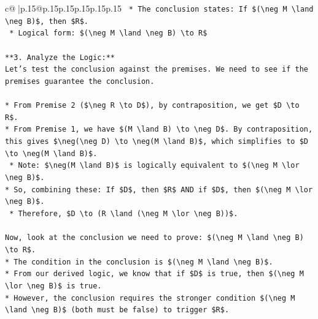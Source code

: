 \documentclass{article}
\begin{document}
{\begin{supertabular}{c@{$\;$}|p{.15\linewidth}@{}p{.15\linewidth}p{.15\linewidth}p{.15\linewidth}p{.15\linewidth}p{.15\linewidth}}
{{{\texttt{    *   The conclusion states: If \$(\textbackslash{}neg M \textbackslash{}land \textbackslash{}neg B)\$, then \$R\$.} \\
\texttt{    *   Logical form: \$(\textbackslash{}neg M \textbackslash{}land \textbackslash{}neg B) \textbackslash{}to R\$} \\
\\ 
\texttt{**3. Analyze the Logic:**} \\
\texttt{Let's test the conclusion against the premises. We need to see if the premises guarantee the conclusion.} \\
\\ 
\texttt{*   From Premise 2 (\$\textbackslash{}neg R \textbackslash{}to D\$), by contraposition, we get \$D \textbackslash{}to R\$.} \\
\texttt{*   From Premise 1, we have \$(M \textbackslash{}land B) \textbackslash{}to \textbackslash{}neg D\$. By contraposition, this gives \$\textbackslash{}neg(\textbackslash{}neg D) \textbackslash{}to \textbackslash{}neg(M \textbackslash{}land B)\$, which simplifies to \$D \textbackslash{}to \textbackslash{}neg(M \textbackslash{}land B)\$.} \\
\texttt{    *   Note: \$\textbackslash{}neg(M \textbackslash{}land B)\$ is logically equivalent to \$(\textbackslash{}neg M \textbackslash{}lor \textbackslash{}neg B)\$.} \\
\texttt{*   So, combining these: If \$D\$, then \$R\$ AND if \$D\$, then \$(\textbackslash{}neg M \textbackslash{}lor \textbackslash{}neg B)\$.} \\
\texttt{    *   Therefore, \$D \textbackslash{}to (R \textbackslash{}land (\textbackslash{}neg M \textbackslash{}lor \textbackslash{}neg B))\$.} \\
\\ 
\texttt{Now, look at the conclusion we need to prove: \$(\textbackslash{}neg M \textbackslash{}land \textbackslash{}neg B) \textbackslash{}to R\$.} \\
\texttt{*   The condition in the conclusion is \$(\textbackslash{}neg M \textbackslash{}land \textbackslash{}neg B)\$.} \\
\texttt{*   From our derived logic, we know that if \$D\$ is true, then \$(\textbackslash{}neg M \textbackslash{}lor \textbackslash{}neg B)\$ is true.} \\
\texttt{*   However, the conclusion requires the stronger condition \$(\textbackslash{}neg M \textbackslash{}land \textbackslash{}neg B)\$ (both must be false) to trigger \$R\$.} \\
}}}
\end{supertabular}}
\end{document}
